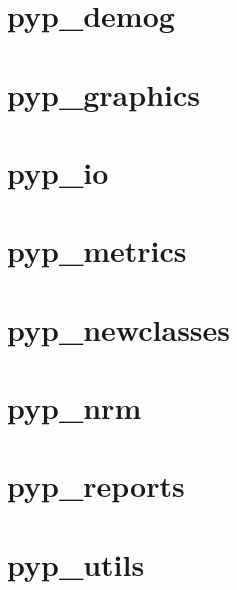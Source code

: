\section{pyp\_demog}

\section{pyp\_graphics}

\section{pyp\_io}

\section{pyp\_metrics}

\section{pyp\_newclasses}

\section{pyp\_nrm}

\section{pyp\_reports}

\section{pyp\_utils}
